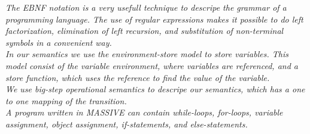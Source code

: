 \vspace{30pt}

\textit{The EBNF notation is a very usefull technique to descripe the grammar of a programming language. The use of regular expressions makes it possible to do left factorization, elimination of left recursion, and substitution of non-terminal symbols in a convenient way.\\ \indent
In our semantics we use the environment-store model to store variables. This model consist of the variable environment, where variables are referenced, and a store function, which uses the reference to find the value of the variable.\\ \indent
We use big-step operational semantics to descripe our semantics, which has a one to one mapping of the transition.\\ \indent
A program written in MASSIVE can contain while-loops, for-loops, variable assignment, object assignment, if-statements, and else-statements.}